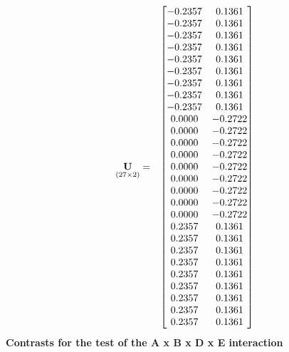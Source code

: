 \documentclass{glimmpse-report}
\begin{document}
\begin{eqnarray*}
\underset{\left(27\times2\right)}{\mathbf{U}} & = & \begin{bmatrix}-0.2357 & 0.1361\protect\\
-0.2357 & 0.1361\protect\\
-0.2357 & 0.1361\protect\\
-0.2357 & 0.1361\protect\\
-0.2357 & 0.1361\protect\\
-0.2357 & 0.1361\protect\\
-0.2357 & 0.1361\protect\\
-0.2357 & 0.1361\protect\\
-0.2357 & 0.1361\protect\\
0.0000 & -0.2722\protect\\
0.0000 & -0.2722\protect\\
0.0000 & -0.2722\protect\\
0.0000 & -0.2722\protect\\
0.0000 & -0.2722\protect\\
0.0000 & -0.2722\protect\\
0.0000 & -0.2722\protect\\
0.0000 & -0.2722\protect\\
0.0000 & -0.2722\protect\\
0.2357 & 0.1361\protect\\
0.2357 & 0.1361\protect\\
0.2357 & 0.1361\protect\\
0.2357 & 0.1361\protect\\
0.2357 & 0.1361\protect\\
0.2357 & 0.1361\protect\\
0.2357 & 0.1361\protect\\
0.2357 & 0.1361\protect\\
0.2357 & 0.1361\protect\\
\end{bmatrix}
\end{eqnarray*}
\newpage\textbf{Contrasts for the test of the A x B x D x E interaction}
\end{document}
